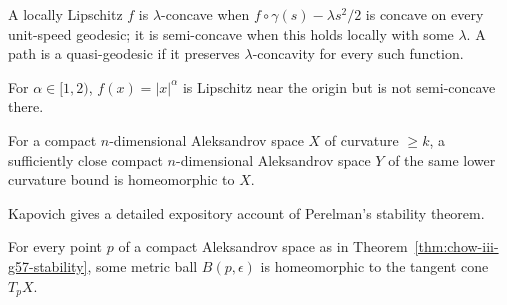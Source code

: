 \begin{definition}
\label{def:chow-iii-g54-g56-semi-concavity}

A locally Lipschitz $f$ is $\lambda$-concave when
$f\circ\gamma(s)-\lambda s^2/2$ is concave on every unit-speed geodesic; it is
semi-concave when this holds locally with some $\lambda$.  A path is a
quasi-geodesic if it preserves $\lambda$-concavity for every such function.
\end{definition}

\begin{example}
\label{ex:chow-iii-g55-power-function}
For $\alpha\in[1,2)$, $f(x)=|x|^\alpha$ is Lipschitz near the origin but is
not semi-concave there.
\end{example}

\begin{theorem}
\label{thm:chow-iii-g57-stability}

For a compact $n$-dimensional Aleksandrov space $X$ of curvature $\geq k$, a
sufficiently close compact $n$-dimensional Aleksandrov space $Y$ of the same
lower curvature bound is homeomorphic to $X$.
\end{theorem}

\begin{remark}
\label{rem:chow-iii-g58-stability-reference}
Kapovich gives a detailed expository account of Perelman's stability theorem.
\end{remark}

\begin{corollary}
\label{cor:chow-iii-g59-small-balls}
For every point $p$ of a compact Aleksandrov space as in Theorem~\ref{thm:chow-iii-g57-stability},
some metric ball $B(p,\epsilon)$ is homeomorphic to the tangent cone $T_pX$.
\end{corollary}

